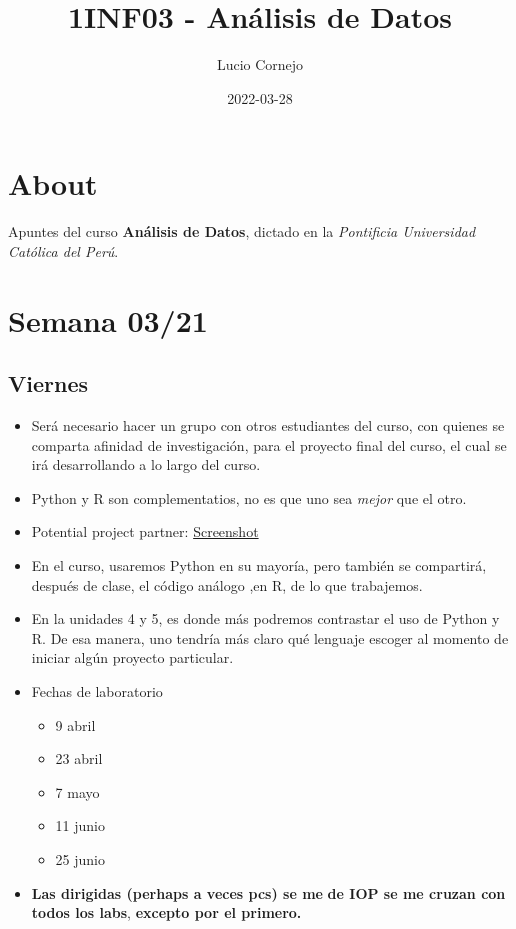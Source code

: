 \documentclass[
]{book}
\title{1INF03 - Análisis de Datos}
\author{Lucio Cornejo}
\date{2022-03-28}
\providecommand{\tightlist}{%
  \setlength{\itemsep}{0pt}\setlength{\parskip}{0pt}}
\begin{document}
\maketitle

{
\setcounter{tocdepth}{1}
\tableofcontents
}
\hypertarget{about}{%
\chapter*{About}\label{about}}

Apuntes del curso \textbf{Análisis de Datos},
dictado en la \emph{Pontificia Universidad Católica del Perú}.

\hypertarget{semana-0321}{%
\chapter{Semana 03/21}\label{semana-0321}}

\hypertarget{viernes}{%
\section{Viernes}\label{viernes}}

\begin{itemize}
\item
  Será necesario hacer un grupo con otros
  estudiantes del curso, con quienes se
  comparta afinidad de investigación, para
  el proyecto final del curso, el cual se
  irá desarrollando a lo largo del curso.
\item
  Python y R son complementatios, no
  es que uno sea \emph{mejor} que el otro.
\item
  Potential project partner:
  \href{C:/Users/HP/Pictures/Screenshots/Captura\%20de\%20pantalla\%20(2118).png}{Screenshot}
\item
  En el curso, usaremos Python en su mayoría,
  pero también se compartirá, después de clase,
  el código análogo ,en R, de lo que trabajemos.
\item
  En la unidades 4 y 5, es donde más podremos
  contrastar el uso de Python y R. De esa manera,
  uno tendría más claro qué lenguaje escoger al
  momento de iniciar algún proyecto particular.
\item
  Fechas de laboratorio\\

  \begin{itemize}
  \tightlist
  \item
    9 abril
  \item
    23 abril
  \item
    7 mayo
  \item
    11 junio
  \item
    25 junio
  \end{itemize}
\item
  \textbf{Las dirigidas (perhaps a veces pcs) se me}
  \textbf{de IOP se me cruzan con todos los labs},
  \textbf{excepto por el primero.}
\end{itemize}
\end{document}
